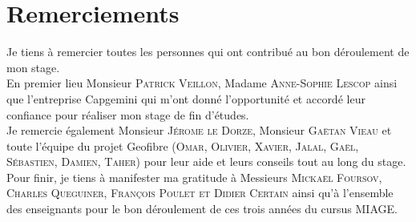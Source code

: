\chapter*{Remerciements}
\begin{flushright}
Je tiens à remercier toutes les personnes qui ont contribué au bon déroulement de mon stage.
\\En premier lieu Monsieur \textsc{Patrick Veillon}, Madame \textsc{Anne-Sophie Lescop} ainsi que l'entreprise Capgemini
qui m'ont donné l'opportunité et accordé leur confiance pour réaliser mon stage de fin d'études.
\\Je remercie également Monsieur \textsc{Jérome le Dorze}, Monsieur \textsc{Gaëtan Vieau} et toute l'équipe du projet Geofibre (\textsc{Omar, Olivier, Xavier, Jalal, Gaël, Sébastien, Damien, Taher}) pour leur aide et leurs conseils tout au long du stage.
\\Pour finir, je tiens à manifester ma gratitude à Messieurs \textsc{Mickaël Foursov, Charles Queguiner, François Poulet et Didier Certain} ainsi qu'à l'ensemble des enseignants pour le bon déroulement de ces trois années du cursus MIAGE.
\end{flushright}
